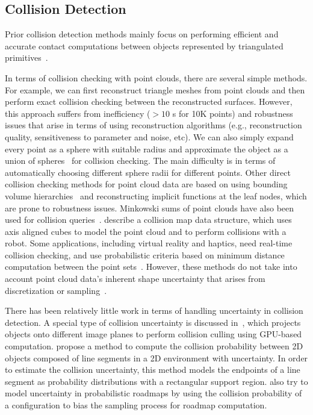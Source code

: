 \subsection{Collision Detection}
Prior collision detection methods mainly focus on performing efficient and accurate contact computations between objects represented by triangulated primitives~\cite{LM03}.

In terms of collision checking with point clouds, there are several simple methods. For example,
we can first reconstruct triangle meshes from point clouds and then perform exact collision checking between the reconstructed surfaces.
However, this approach suffers from inefficiency ($>10$ s for 10K points) and robustness issues that arise in terms of using reconstruction algorithms (e.g., reconstruction quality, sensitiveness to parameter and noise, etc). We can also simply expand every point as a sphere with suitable radius and approximate the object as a union of spheres~\cite{Hubbard:1996} for collision checking. The main difficulty is in terms of automatically choosing different sphere radii for different points. Other direct collision checking methods for point cloud data are based on using bounding volume hierarchies~\cite{Jan:2004,Sternemann:2007} and reconstructing implicit functions at the leaf nodes, which are prone to robustness issues. Minkowski sums of point clouds have also been used for collision queries~\cite{Lien:2007}. \cite{Ioan:2010} describe a collision map data structure, which uses axis aligned cubes to model the point cloud and to perform collisions with a robot.
Some applications, including virtual reality and haptics, need real-time collision checking, and use probabilistic criteria based on minimum distance computation between the point sets~\cite{Lee:haptics:2007}. However, these methods do not take into account point cloud data's inherent shape uncertainty that arises from discretization or sampling~\cite{Pauly:2004}.

There has been relatively little work in terms of handling uncertainty in collision detection. A special type of collision uncertainty is discussed in~\cite{Govindaraju:2006:VRST}, which projects objects onto different image planes to perform collision culling using GPU-based computation. \cite{Guibas:wafr2009} propose a method to compute the collision probability between 2D objects composed of line segments in a 2D environment with uncertainty. In order to estimate the collision uncertainty, this method models the endpoints of a line segment as probability distributions with a rectangular support region. \cite{Missiuro:2006} also try to model uncertainty in probabilistic roadmaps by using the collision probability of a configuration to bias the sampling process for roadmap computation.


